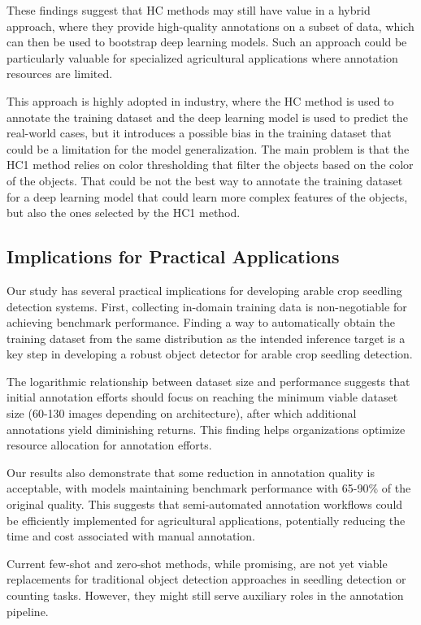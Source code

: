 \documentclass[journal,article,submit,pdftex,moreauthors]{Definitions/mdpi}
\begin{document}
These findings suggest that HC methods may still have value in a hybrid approach, where 
they provide high-quality annotations on a subset of data, which can then be used to 
bootstrap deep learning models. Such an approach could be particularly valuable for 
specialized agricultural applications where annotation resources are limited.

This approach is highly adopted in industry, where the HC method is used to
annotate the training dataset and the deep learning model is used to predict the real-world
cases, but it introduces a possible bias in the training dataset that could be a limitation
for the model generalization. The main problem is that the HC1 method relies
on color thresholding that filter the 
objects based on the color of the objects. That could be not the best
way to annotate the training dataset for a deep learning model that could learn
more complex features of the objects, but also the ones selected by the HC1 method.

\subsection{Implications for Practical Applications}
Our study has several practical implications for developing arable crop seedling detection systems.
First, collecting in-domain training data is non-negotiable for achieving benchmark performance. 
Finding a way to automatically obtain the training dataset from the same distribution as the intended 
inference target is a key step in developing a robust object detector for arable crop seedling detection.

The logarithmic relationship between dataset size and performance suggests that initial annotation 
efforts should focus on reaching the minimum viable dataset size (60-130 images depending on architecture), 
after which additional annotations yield diminishing returns. This finding helps organizations optimize 
resource allocation for annotation efforts.

Our results also demonstrate that some reduction in annotation quality is acceptable, with models 
maintaining benchmark performance with 65-90\% of the original quality. This suggests that semi-automated 
annotation workflows could be efficiently implemented for agricultural applications, potentially reducing 
the time and cost associated with manual annotation.

Current few-shot and zero-shot methods, while promising, are not yet viable replacements for traditional 
object detection approaches in seedling detection or counting tasks. However, they might still serve 
auxiliary roles in the annotation pipeline.
\end{document}
